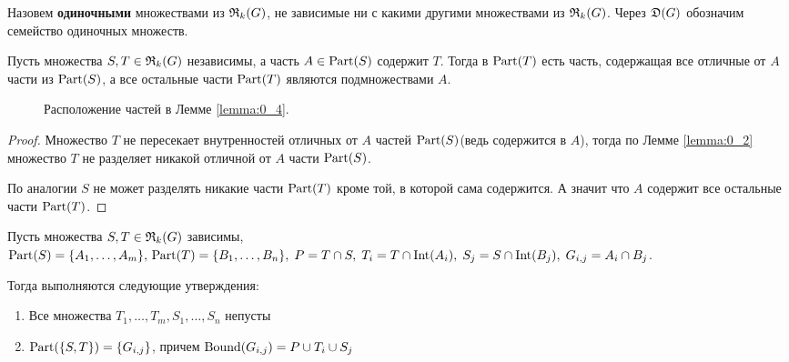 \begin{df*}
	Назовем \textbf{одиночными} множествами из $\mathfrak{R}_k(G)$, не зависимые ни с какими другими множествами из $\mathfrak{R}_k(G)$.
	Через $\mathfrak{D}(G)$ обозначим семейство одиночных множеств. 
\end{df*}

\begin{customlm}{0.4} \label{lemma:0_4}
	Пусть множества $S, T \in \mathfrak{R}_k(G)$ независимы, а часть  $A \in \operatorname{Part}(S)$ содержит  $T$.
	Тогда в  $\operatorname{Part}(T)$ есть часть, содержащая все отличные от  $A$ части из $\operatorname{Part}(S)$, а все остальные части $\operatorname{Part}(T)$ являются подмножествами  $A$.
\end{customlm}

\begin{figure}[ht]
    \centering
	\caption{Расположение частей в Лемме \ref{lemma:0_4}.}
    \label{fig:lemma_0_4}
\end{figure}

\begin{proof}
	Множество $T$ не пересекает внутренностей отличных от  $A$ частей  $\operatorname{Part}(S)$(ведь содержится в $A$), тогда по Лемме \ref{lemma:0_2} множество $T$ не разделяет никакой отличной от  $A$ части $\operatorname{Part}(S)$.

	По аналогии $S$ не может разделять никакие части  $\operatorname{Part}(T)$ кроме той, в которой сама содержится. А значит что $A$ содержит все остальные части  $\operatorname{Part}(T)$.

\end{proof}

\begin{customlm}{0.5} \label{lemma:0_5}
	Пусть множества $S, T \in \mathfrak{R}_k(G)$ зависимы,  $\operatorname{Part}(S) = \{A_1, \ldots, A_m\}, \, \operatorname{Part}(T) = \{B_1, \ldots, B_n\}, \; P = T \cap S, \; T_i = T \cap \operatorname{Int}(A_i), \; S_j = S \cap \operatorname{Int}(B_j), \; G_{i, j} = A_i \cap B_j$.

	Тогда выполняются следующие утверждения:

	\begin{enumerate}
		\item Все множества $T_1, \ldots, T_m, S_1, \ldots, S_n$ непусты
		\item $\operatorname{Part}(\{S, T\}) = \{G_{i, j}\}$, причем  $\operatorname{Bound}(G_{i, j}) = P \cup T_i \cup S_j$
	\end{enumerate}

\end{customlm}

